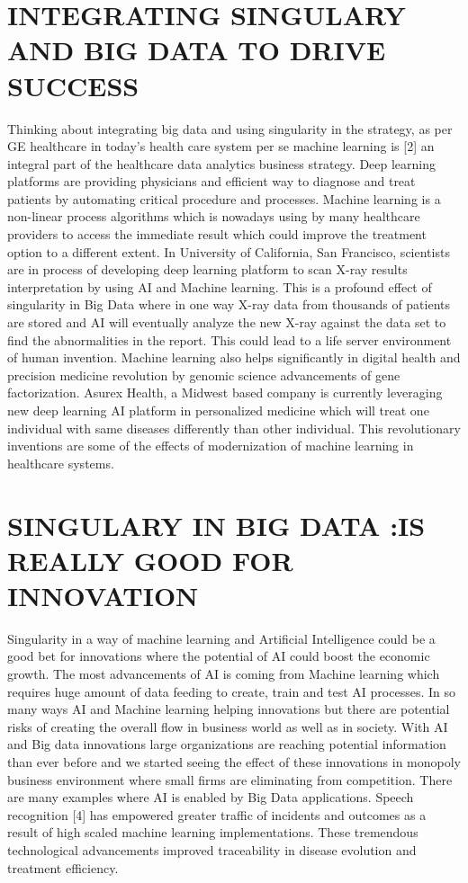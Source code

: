 \documentclass{sig-alternate}
\begin{document}
\section{INTEGRATING SINGULARY AND BIG DATA TO DRIVE SUCCESS}
Thinking about integrating big data and using singularity in the strategy, as per GE healthcare in today’s health care system per se machine learning is [2] an integral part of the healthcare data analytics business strategy. Deep learning platforms are providing physicians and efficient way to diagnose and treat patients by automating critical procedure and processes. Machine learning is a non-linear process algorithms which is nowadays using by many healthcare providers to access the immediate result which could improve the treatment option to a different extent. In University of California, San Francisco, scientists are in process of developing deep learning platform to scan X-ray results interpretation by using AI and Machine learning. This is a profound effect of singularity in Big Data where in one way X-ray data from thousands of patients are stored and AI will eventually analyze the new X-ray against the data set to find the abnormalities in the report. This could lead to a life server environment of human invention. Machine learning also helps significantly in digital health and precision medicine revolution by genomic science advancements of gene factorization. Asurex Health, a Midwest based company is currently leveraging new deep learning AI platform in personalized medicine which will treat one individual with same diseases differently than other individual. This revolutionary inventions are some of the effects of modernization of machine learning in healthcare systems. 

\section{SINGULARY IN BIG DATA :IS REALLY GOOD FOR INNOVATION}
Singularity in a way of machine learning and Artificial Intelligence could be a good bet for innovations where the potential of AI could boost the economic growth. The most advancements of AI is coming from Machine learning which requires huge amount of data feeding to create, train and test AI processes. In so many ways AI and Machine learning helping innovations but there are potential risks of creating the overall flow in business world as well as in society. With AI and Big data innovations large organizations are reaching potential information than ever before and we started seeing the effect of these innovations in monopoly business environment where small firms are eliminating from competition. There are many examples where AI is enabled by Big Data applications. Speech recognition [4] has empowered greater traffic of incidents and outcomes as a result of high scaled machine learning implementations. These tremendous technological advancements improved traceability in disease evolution and treatment efficiency. 
\end{document}
